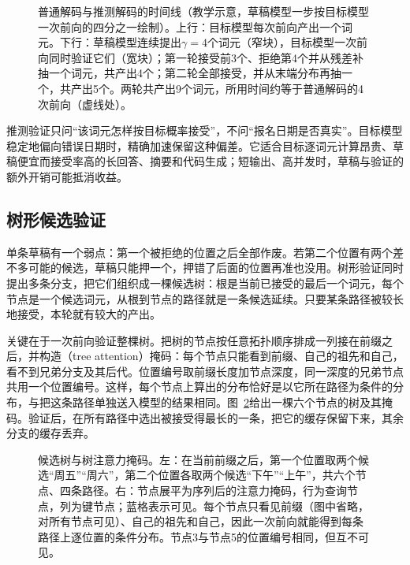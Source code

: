 \begin{figure}[tbp]
  \centering
  
  \caption{普通解码与推测解码的时间线（教学示意，草稿模型一步按目标模型一次前向的四分之一绘制）。上行：目标模型每次前向产出一个词元。下行：草稿模型连续提出$\gamma=4$个词元（窄块），目标模型一次前向同时验证它们（宽块）；第一轮接受前3个、拒绝第4个并从残差补抽一个词元，共产出4个；第二轮全部接受，并从末端分布再抽一个，共产出5个。两轮共产出9个词元，所用时间约等于普通解码的4次前向（虚线处）。}
  \label{fig:nlp-inference-speculative-timeline}
\end{figure}

推测验证只问“该词元怎样按目标概率接受”，不问“报名日期是否真实”。目标模型稳定地偏向错误日期时，精确加速保留这种偏差。它适合目标逐词元计算昂贵、草稿便宜而接受率高的长回答、摘要和代码生成；短输出、高并发时，草稿与验证的额外开销可能抵消收益。

\subsection{树形候选验证}
\label{sec:nlp-inference-tree-verify}

单条草稿有一个弱点：第一个被拒绝的位置之后全部作废。若第二个位置有两个差不多可能的候选，草稿只能押一个，押错了后面的位置再准也没用。树形验证同时提出多条分支，把它们组织成一棵候选树：根是当前已接受的最后一个词元，每个节点是一个候选词元，从根到节点的路径就是一条候选延续。只要某条路径被较长地接受，本轮就有较大的产出。

关键在于一次前向验证整棵树。把树的节点按任意拓扑顺序排成一列接在前缀之后，并构造（tree attention）掩码：每个节点只能看到前缀、自己的祖先和自己，看不到兄弟分支及其后代。位置编号取前缀长度加节点深度，同一深度的兄弟节点共用一个位置编号。这样，每个节点上算出的分布恰好是以它所在路径为条件的分布，与把这条路径单独送入模型的结果相同。图~\ref{fig:nlp-inference-tree-attention}给出一棵六个节点的树及其掩码。验证后，在所有路径中选出被接受得最长的一条，把它的缓存保留下来，其余分支的缓存丢弃。

\begin{figure}[htbp]
  \centering
  
  \caption{候选树与树注意力掩码。左：在当前前缀之后，第一个位置取两个候选“周五”“周六”，第二个位置各取两个候选“下午”“上午”，共六个节点、四条路径。右：节点展平为序列后的注意力掩码，行为查询节点，列为键节点；蓝格表示可见。每个节点只看见前缀（图中省略，对所有节点可见）、自己的祖先和自己，因此一次前向就能得到每条路径上逐位置的条件分布。节点3与节点5的位置编号相同，但互不可见。}
  \label{fig:nlp-inference-tree-attention}
\end{figure}

